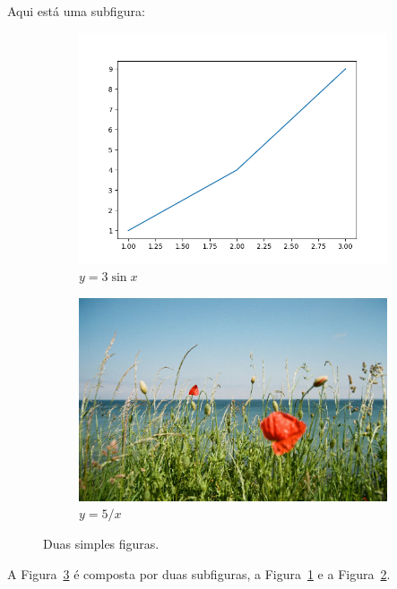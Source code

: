     \newpage

    Aqui está uma subfigura:

    \begin{figure}[htb!]
        \centering
        \begin{subfigure}[b]{0.45\textwidth}
             \centering
             \includegraphics[width=\textwidth]{figures/figure}
             \caption{$y=3\sin x$}
             \label{fig:three sin x}
         \end{subfigure}
         \hfill
         \begin{subfigure}[b]{0.45\textwidth}
             \centering
             \includegraphics[width=\textwidth]{figures/flores}
             \caption{$y=5/x$}
             \label{fig:five over x}
         \end{subfigure}
            \caption{Duas simples figuras.}
            \label{fig:twographs}
    \end{figure}

    A Figura~\ref{fig:twographs} é composta por duas subfiguras, a Figura~\ref{fig:three sin x} e a Figura~\ref{fig:five over x}.